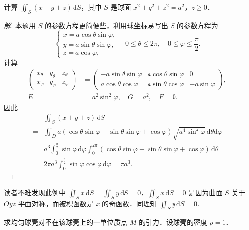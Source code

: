 \begin{example}\label{ex:21-2-2}
计算 $\displaystyle\iint_{S}(x+y+z)\,\mathrm{d}S$，其中 $S$ 是球面 $x^{2}+y^{2}+z^{2}=a^{2}$，$z\geqslant0$．
\end{example}

\begin{proof}[解]
本题用 $S$ 的参数方程更简便些，利用球坐标易写出 $S$ 的参数方程为
\[
\begin{cases}
x=a\cos\theta\sin\varphi,\\
y=a\sin\theta\sin\varphi,\\
z=a\cos\varphi,
\end{cases}
\quad 0\leqslant\theta\leqslant2\pi,\quad 0\leqslant\varphi\leqslant\frac{\pi}{2}.
\]
计算
\[
\begin{aligned}
\begin{pmatrix}x_{\theta}&y_{\theta}&z_{\theta}\\ x_{\varphi}&y_{\varphi}&z_{\varphi}\end{pmatrix}
&=\begin{pmatrix}-a\sin\theta\sin\varphi&a\cos\theta\sin\varphi&0\\ a\cos\theta\cos\varphi&a\sin\theta\cos\varphi&-a\sin\varphi\end{pmatrix},\\
E&=a^{2}\sin^{2}\varphi,\quad G=a^{2},\quad F=0.
\end{aligned}
\]
因此
\[
\begin{aligned}
&\iint_{S}(x+y+z)\,\mathrm{d}S\\
={}&\iint_{D}a(\cos\theta\sin\varphi+\sin\theta\sin\varphi+\cos\varphi)\sqrt{a^{4}\sin^{2}\varphi}\,\mathrm{d}\theta\mathrm{d}\varphi\\
={}&a^{3}\int_{0}^{\frac{\pi}{2}}\sin\varphi\,\mathrm{d}\varphi\int_{0}^{2\pi}(\cos\theta\sin\varphi+\sin\theta\sin\varphi+\cos\varphi)\,\mathrm{d}\theta\\
={}&2\pi a^{3}\int_{0}^{\frac{\pi}{2}}\sin\varphi\cos\varphi\,\mathrm{d}\varphi=\pi a^{3}.
\end{aligned}
\]
\end{proof}

读者不难发现此例中 $\displaystyle\iint_{S}x\,\mathrm{d}S=\iint_{S}y\,\mathrm{d}S=0$．$\iint_{S}x\,\mathrm{d}S=0$ 是因为曲面 $S$ 关于 $Oyz$ 平面对称，而被积函数是 $x$ 的奇函数．同理知 $\displaystyle\iint_{S}y\,\mathrm{d}S=0$．

\begin{example}\label{ex:21-2-3}
求均匀球壳对不在该球壳上的一单位质点 $M$ 的引力．设球壳的密度 $\rho=1$．
\end{example}

